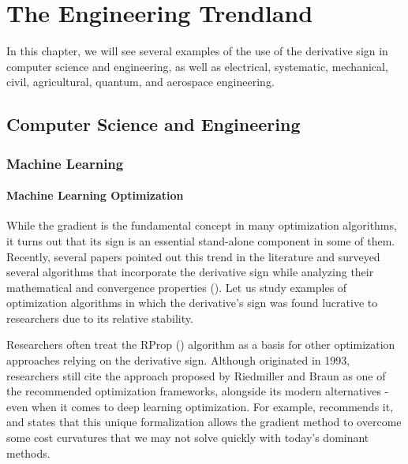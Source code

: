 \documentclass[11pt]{book}
\begin{document}
\chapter{The Engineering Trendland}

In this chapter, we will see several examples of the use of the derivative sign in computer science and engineering, as well as electrical, systematic, mechanical, civil, agricultural, quantum, and aerospace engineering.


\section{Computer Science and Engineering}


\subsection{Machine Learning}

\label{machine_learning_subsection}


\subsubsection{Machine Learning Optimization}

While the gradient is the fundamental concept in many optimization
algorithms, it turns out that its sign is an essential stand-alone
component in some of them. Recently, several papers pointed out this
trend in the literature and surveyed several algorithms that incorporate
the derivative sign while analyzing their mathematical and convergence
properties (\cite{wang2019signadam++,moulay2019properties}). Let
us study examples of optimization algorithms in which the derivative's
sign was found lucrative to researchers due to its relative stability.

Researchers often treat the RProp (\cite{riedmiller1993direct}) algorithm
as a basis for other optimization approaches relying on the derivative
sign. Although originated in 1993, researchers still cite the approach
proposed by Riedmiller and Braun as one of the recommended optimization
frameworks, alongside its modern alternatives - even when it comes
to deep learning optimization. For example, \cite{behnke2003hierarchical}
recommends it, and \cite{wang2017origin} states that this unique
formalization allows the gradient method to overcome some cost curvatures
that we may not solve quickly with today's dominant methods.
\end{document}
